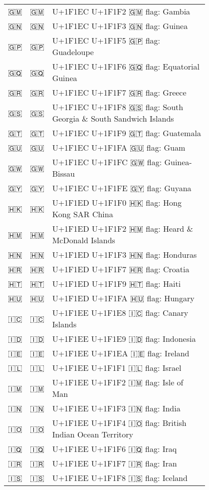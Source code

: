 \documentclass[a4paper,12pt]{ltjarticle}
\newcommand{\fontA}[1]{{\fontspec[RawFeature={mode=harf,+dist,+ccmp}]{Segoe UI Emoji} #1}}
\newcommand{\fontB}[1]{{\fontspec[RawFeature={mode=harf,+dist,+ccmp}]{Noto Color Emoji} #1}}
\begin{document}
\begin{longtable}[c]{ccp{0.8\linewidth}}
\fontA{🇬🇲}&\fontB{🇬🇲}&U+1F1EC U+1F1F2 🇬🇲 flag: Gambia\\
\fontA{🇬🇳}&\fontB{🇬🇳}&U+1F1EC U+1F1F3 🇬🇳 flag: Guinea\\
\fontA{🇬🇵}&\fontB{🇬🇵}&U+1F1EC U+1F1F5 🇬🇵 flag: Guadeloupe\\
\fontA{🇬🇶}&\fontB{🇬🇶}&U+1F1EC U+1F1F6 🇬🇶 flag: Equatorial Guinea\\
\fontA{🇬🇷}&\fontB{🇬🇷}&U+1F1EC U+1F1F7 🇬🇷 flag: Greece\\
\fontA{🇬🇸}&\fontB{🇬🇸}&U+1F1EC U+1F1F8 🇬🇸 flag: South Georgia \& South Sandwich Islands\\
\fontA{🇬🇹}&\fontB{🇬🇹}&U+1F1EC U+1F1F9 🇬🇹 flag: Guatemala\\
\fontA{🇬🇺}&\fontB{🇬🇺}&U+1F1EC U+1F1FA 🇬🇺 flag: Guam\\
\fontA{🇬🇼}&\fontB{🇬🇼}&U+1F1EC U+1F1FC 🇬🇼 flag: Guinea-Bissau\\
\fontA{🇬🇾}&\fontB{🇬🇾}&U+1F1EC U+1F1FE 🇬🇾 flag: Guyana\\
\fontA{🇭🇰}&\fontB{🇭🇰}&U+1F1ED U+1F1F0 🇭🇰 flag: Hong Kong SAR China\\
\fontA{🇭🇲}&\fontB{🇭🇲}&U+1F1ED U+1F1F2 🇭🇲 flag: Heard \& McDonald Islands\\
\fontA{🇭🇳}&\fontB{🇭🇳}&U+1F1ED U+1F1F3 🇭🇳 flag: Honduras\\
\fontA{🇭🇷}&\fontB{🇭🇷}&U+1F1ED U+1F1F7 🇭🇷 flag: Croatia\\
\fontA{🇭🇹}&\fontB{🇭🇹}&U+1F1ED U+1F1F9 🇭🇹 flag: Haiti\\
\fontA{🇭🇺}&\fontB{🇭🇺}&U+1F1ED U+1F1FA 🇭🇺 flag: Hungary\\
\fontA{🇮🇨}&\fontB{🇮🇨}&U+1F1EE U+1F1E8 🇮🇨 flag: Canary Islands\\
\fontA{🇮🇩}&\fontB{🇮🇩}&U+1F1EE U+1F1E9 🇮🇩 flag: Indonesia\\
\fontA{🇮🇪}&\fontB{🇮🇪}&U+1F1EE U+1F1EA 🇮🇪 flag: Ireland\\
\fontA{🇮🇱}&\fontB{🇮🇱}&U+1F1EE U+1F1F1 🇮🇱 flag: Israel\\
\fontA{🇮🇲}&\fontB{🇮🇲}&U+1F1EE U+1F1F2 🇮🇲 flag: Isle of Man\\
\fontA{🇮🇳}&\fontB{🇮🇳}&U+1F1EE U+1F1F3 🇮🇳 flag: India\\
\fontA{🇮🇴}&\fontB{🇮🇴}&U+1F1EE U+1F1F4 🇮🇴 flag: British Indian Ocean Territory\\
\fontA{🇮🇶}&\fontB{🇮🇶}&U+1F1EE U+1F1F6 🇮🇶 flag: Iraq\\
\fontA{🇮🇷}&\fontB{🇮🇷}&U+1F1EE U+1F1F7 🇮🇷 flag: Iran\\
\fontA{🇮🇸}&\fontB{🇮🇸}&U+1F1EE U+1F1F8 🇮🇸 flag: Iceland\\

\end{longtable}
\end{document}
